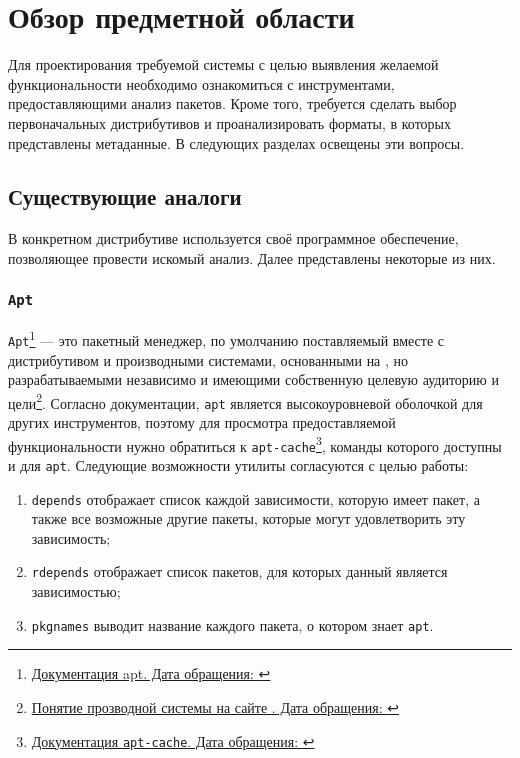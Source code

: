
\section{Обзор предметной области}
\label{sec:relatedworks}
Для проектирования требуемой системы с целью выявления желаемой функциональности необходимо ознакомиться с инструментами, предоставляющими анализ пакетов.
Кроме того, требуется сделать выбор первоначальных дистрибутивов и проанализировать форматы, в которых представлены метаданные.
В следующих разделах освещены эти вопросы.

\subsection{Существующие аналоги}
В конкретном дистрибутиве используется своё программное обеспечение, позволяющее провести искомый анализ.
Далее представлены некоторые из них.

\subsubsection{\texttt{Apt}}
\texttt{Apt}\footnote{\href{https://manpages.debian.org/stretch/apt/apt.8.en.html\#SCRIPT\_USAGE\_AND\_DIFFERENCES\_FROM\_OTHER\_APT\_TOOLS/}{Документация apt. Дата обращения: }} --- это пакетный менеджер, по умолчанию поставляемый вместе с дистрибутивом {\debian} и производными системами, основанными на {\debian}, но разрабатываемыми независимо и имеющими собственную целевую аудиторию и цели\footnote{\href{https://www.debian.org/derivatives/}{Понятие прозводной системы на сайте {\debian}. Дата обращения: }}.
Согласно документации, \texttt{apt} является высокоуровневой оболочкой для других инструментов, поэтому для просмотра предоставляемой функциональности нужно обратиться к \texttt{apt-cache}\footnote{\href{https://manpages.debian.org/stretch/apt/apt-cache.8.en.html}{Документация \texttt{apt-cache}. Дата обращения: }}, команды которого доступны и для \texttt{apt}.
Следующие возможности утилиты согласуются с целью работы:
\begin{enumerate}
	\item \texttt{depends} отображает список каждой зависимости, которую имеет пакет, а также все возможные другие пакеты, которые могут удовлетворить эту зависимость;
	\item \texttt{rdepends} отображает список пакетов, для которых данный является зависимостью;
	\item \texttt{pkgnames} выводит название каждого пакета, о котором знает \texttt{apt}.
\end{enumerate}

